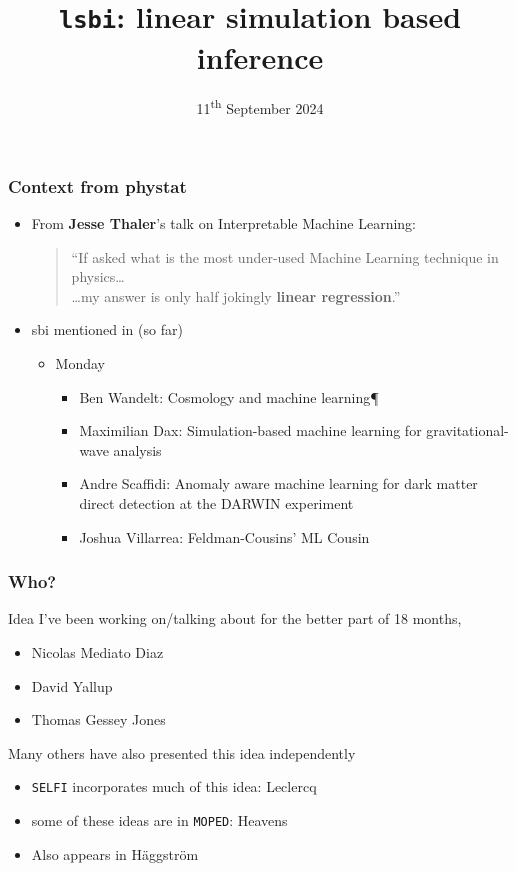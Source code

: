 \documentclass[aspectratio=169]{beamer}
\title{\texttt{lsbi}: linear simulation based inference }
\date{11\textsuperscript{th} September 2024}
\begin{document}
\begin{frame}
    \titlepage
\end{frame}

\begin{frame}
    \frametitle{Context from phystat}
    \begin{itemize}
        \item From \textbf{Jesse Thaler}'s talk on Interpretable Machine Learning:
            \begin{quote}
                ``If asked what is the most under-used Machine Learning technique in physics\ldots\\ \hfill\ldots my answer is only half jokingly \textbf{linear regression}.''
            \end{quote}
        \item sbi mentioned in (so far)
            \begin{itemize}
                \item Monday
                    \begin{itemize}
                        \item Ben Wandelt: Cosmology and machine learning¶
                        \item Maximilian Dax: Simulation-based machine learning for gravitational-wave analysis
                        \item Andre Scaffidi: Anomaly aware machine learning for dark matter direct detection at the DARWIN experiment
                        \item Joshua Villarrea: Feldman-Cousins’ ML Cousin
                    \end{itemize}
            \end{itemize}
    \end{itemize}
\end{frame}

\begin{frame}
    \frametitle{Who?}
    Idea I've been working on/talking about for the better part of 18 months,
    \begin{itemize}
        \item Nicolas Mediato Diaz
        \item David Yallup
        \item Thomas Gessey Jones
    \end{itemize}

    Many others have also presented this idea independently
    \begin{itemize}
        \item \texttt{SELFI} incorporates much of this idea: Leclercq~
        \item some of these ideas are in \texttt{MOPED}: Heavens~
        \item Also appears in Häggström~
    \end{itemize}
\end{frame}
\end{document}
